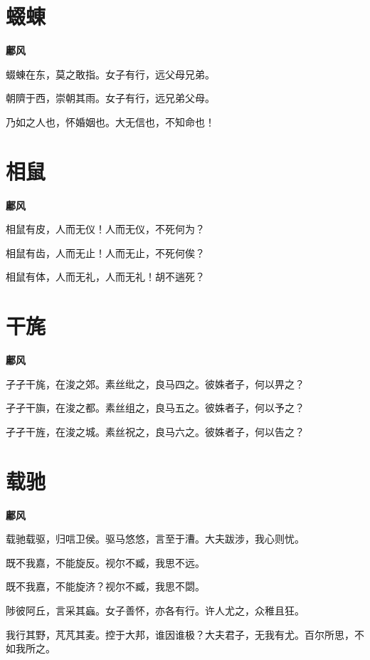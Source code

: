 \documentclass[12pt,a4paper]{ctexbook}
\begin{document}
\section{蝃蝀}
\textbf{鄘风}\par\vspace{0.5em}
蝃蝀在东，莫之敢指。女子有行，远父母兄弟。\par
朝隮于西，崇朝其雨。女子有行，远兄弟父母。\par
乃如之人也，怀婚姻也。大无信也，不知命也！\par

\section{相鼠}
\textbf{鄘风}\par\vspace{0.5em}
相鼠有皮，人而无仪！人而无仪，不死何为？\par
相鼠有齿，人而无止！人而无止，不死何俟？\par
相鼠有体，人而无礼，人而无礼！胡不遄死？\par

\section{干旄}
\textbf{鄘风}\par\vspace{0.5em}
孑孑干旄，在浚之郊。素丝纰之，良马四之。彼姝者子，何以畀之？\par
孑孑干旟，在浚之都。素丝组之，良马五之。彼姝者子，何以予之？\par
孑孑干旌，在浚之城。素丝祝之，良马六之。彼姝者子，何以告之？\par

\section{载驰}
\textbf{鄘风}\par\vspace{0.5em}
载驰载驱，归唁卫侯。驱马悠悠，言至于漕。大夫跋涉，我心则忧。\par
既不我嘉，不能旋反。视尔不臧，我思不远。\par
既不我嘉，不能旋济？视尔不臧，我思不閟。\par
陟彼阿丘，言采其蝱。女子善怀，亦各有行。许人尤之，众稚且狂。\par
我行其野，芃芃其麦。控于大邦，谁因谁极？大夫君子，无我有尤。百尔所思，不如我所之。\par
\end{document}
